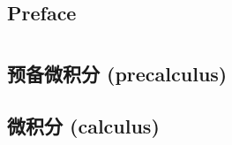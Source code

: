 \documentclass[openany]{book}
\begin{document}
\addtocounter{page}{2}

\setcounter{tocdepth}{1}
\tableofcontents

\chapter*{Preface}



\mainmatter

\part{}

\chapter{预备微积分 (precalculus)}










\chapter{微积分 (calculus)}












\backmatter
{}
\printindex
\end{document}
